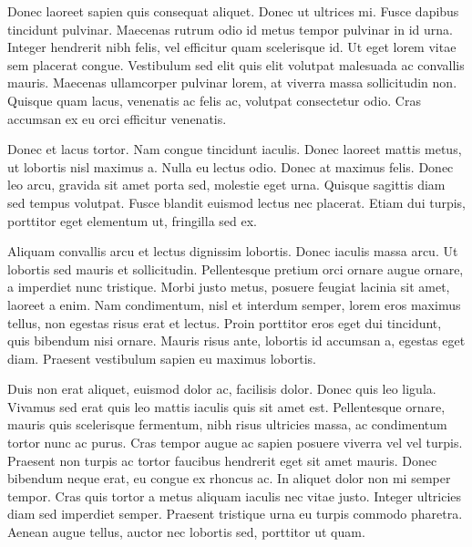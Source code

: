Donec laoreet sapien quis consequat aliquet. Donec ut ultrices mi. Fusce dapibus tincidunt pulvinar. Maecenas rutrum odio id metus tempor pulvinar in id urna. Integer hendrerit nibh felis, vel efficitur quam scelerisque id. Ut eget lorem vitae sem placerat congue. Vestibulum sed elit quis elit volutpat malesuada ac convallis mauris. Maecenas ullamcorper pulvinar lorem, at viverra massa sollicitudin non. Quisque quam lacus, venenatis ac felis ac, volutpat consectetur odio. Cras accumsan ex eu orci efficitur venenatis.

Donec et lacus tortor. Nam congue tincidunt iaculis. Donec laoreet mattis metus, ut lobortis nisl maximus a. Nulla eu lectus odio. Donec at maximus felis. Donec leo arcu, gravida sit amet porta sed, molestie eget urna. Quisque sagittis diam sed tempus volutpat. Fusce blandit euismod lectus nec placerat. Etiam dui turpis, porttitor eget elementum ut, fringilla sed ex.

Aliquam convallis arcu et lectus dignissim lobortis. Donec iaculis massa arcu. Ut lobortis sed mauris et sollicitudin. Pellentesque pretium orci ornare augue ornare, a imperdiet nunc tristique. Morbi justo metus, posuere feugiat lacinia sit amet, laoreet a enim. Nam condimentum, nisl et interdum semper, lorem eros maximus tellus, non egestas risus erat et lectus. Proin porttitor eros eget dui tincidunt, quis bibendum nisi ornare. Mauris risus ante, lobortis id accumsan a, egestas eget diam. Praesent vestibulum sapien eu maximus lobortis.

Duis non erat aliquet, euismod dolor ac, facilisis dolor. Donec quis leo ligula. Vivamus sed erat quis leo mattis iaculis quis sit amet est. Pellentesque ornare, mauris quis scelerisque fermentum, nibh risus ultricies massa, ac condimentum tortor nunc ac purus. Cras tempor augue ac sapien posuere viverra vel vel turpis. Praesent non turpis ac tortor faucibus hendrerit eget sit amet mauris. Donec bibendum neque erat, eu congue ex rhoncus ac. In aliquet dolor non mi semper tempor. Cras quis tortor a metus aliquam iaculis nec vitae justo. Integer ultricies diam sed imperdiet semper. Praesent tristique urna eu turpis commodo pharetra. Aenean augue tellus, auctor nec lobortis sed, porttitor ut quam.





\appendix
%


